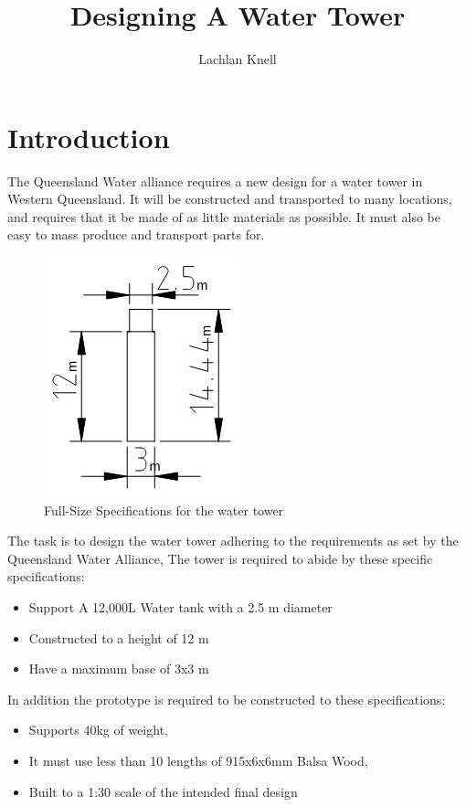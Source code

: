 \documentclass[12pt,landscape]{article}
\title{Designing A Water Tower}
\author{Lachlan Knell}
\begin{document}
\maketitle

\section{Introduction}
The Queensland Water alliance requires a new design for a water tower in Western Queensland. It will be constructed and transported to many locations, and requires that it be made of as little materials as possible. It must also be easy to mass produce and transport parts for.


\begin{figure}
	\centering
	\includegraphics[trim={0 0cm 0 0cm},clip,scale=0.75]{WaterTower.jpg}
	\caption{\label{fig:BigWaterTower}Full-Size Specifications for the water tower}
\end{figure}

\vspace{5mm}

The task is to design the water tower adhering to the requirements as set by the Queensland Water Alliance, The tower is required to abide by these specific specifications:
\begin{itemize}
	\item Support A 12,000L Water tank with a 2.5 m diameter 
	\item Constructed to a height of 12 m
	\item Have a maximum base of 3x3 m 

\end{itemize}

\vspace{5mm}
In addition the prototype is required to be constructed to these specifications:
\begin{itemize}
	\item Supports 40kg of weight,
	\item It must use less than 10 lengths of 915x6x6mm Balsa Wood,
	\item Built to a 1:30 scale of the intended final design 
\end{itemize}
\end{document}
